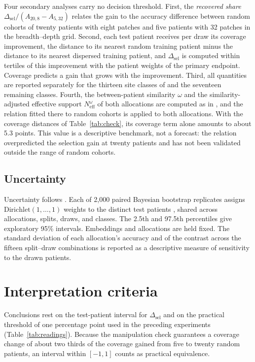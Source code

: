 \documentclass[11pt]{article}
\newcommand{\Neff}{N_{\mathrm{eff}}}
\begin{document}
Four secondary analyses carry no decision threshold. First, the \emph{recovered share} $\Delta_{\mathrm{sel}}/(A_{20,8}-A_{5,32})$ relates the gain to the accuracy difference between random cohorts of twenty patients with eight patches and five patients with 32 patches in the breadth--depth grid. Second, each test patient receives per draw its coverage improvement, the distance to its nearest random training patient minus the distance to its nearest dispersed training patient, and $\Delta_{\mathrm{sel}}$ is computed within tertiles of this improvement with the patient weights of the primary endpoint. Coverage predicts a gain that grows with the improvement. Third, all quantities are reported separately for the thirteen site classes of \citet{queisler2026siteCoverage} and the seventeen remaining classes. Fourth, the between-patient similarity $\omega$ and the similarity-adjusted effective support $\Neff^{\omega}$ of both allocations are computed as in \citet{queisler2026coverageRedundancy}, and the relation fitted there to random cohorts is applied to both allocations. With the coverage distances of Table~\ref{tab:check}, its coverage term alone amounts to about 5.3 points. This value is a descriptive benchmark, not a forecast: the relation overpredicted the selection gain at twenty patients and has not been validated outside the range of random cohorts.

\subsection{Uncertainty}
\label{sec:uncertainty}
Uncertainty follows \citet{queisler2026effectiveSupport}. Each of 2,000 paired Bayesian bootstrap replicates assigns $\mathrm{Dirichlet}(1,\ldots,1)$ weights to the distinct test patients \citep{rubin1981bayesian}, shared across allocations, splits, draws, and classes. The 2.5th and 97.5th percentiles give exploratory 95\% intervals. Embeddings and allocations are held fixed. The standard deviation of each allocation's accuracy and of the contrast across the fifteen split--draw combinations is reported as a descriptive measure of sensitivity to the drawn patients.

\section{Interpretation criteria}
\label{sec:interpretation}
Conclusions rest on the test-patient interval for $\Delta_{\mathrm{sel}}$ and on the practical threshold of one percentage point used in the preceding experiments (Table~\ref{tab:readings}). Because the manipulation check guarantees a coverage change of about two thirds of the coverage gained from five to twenty random patients, an interval within $[-1,1]$ counts as practical equivalence.
\end{document}

